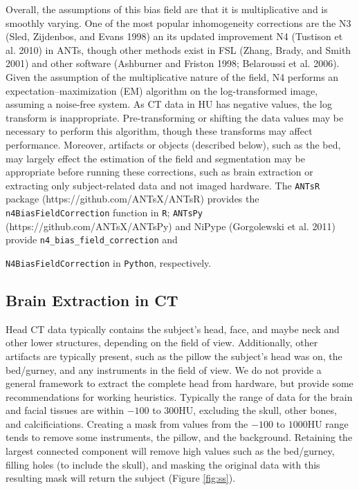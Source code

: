 \documentclass[]{elsarticle} %
\begin{document}
Overall, the assumptions of this bias field are that it is multiplicative and is smoothly varying. One of the most popular inhomogeneity corrections are the N3 (Sled, Zijdenbos, and Evans 1998) an its updated improvement N4 (Tustison et al. 2010) in ANTs, though other methods exist in FSL (Zhang, Brady, and Smith 2001) and other software (Ashburner and Friston 1998; Belaroussi et al. 2006). Given the assumption of the multiplicative nature of the field, N4 performs an expectation--maximization (EM) algorithm on the log-transformed image, assuming a noise-free system. As CT data in HU has negative values, the log transform is inappropriate. Pre-transforming or shifting the data values may be necessary to perform this algorithm, though these transforms may affect performance. Moreover, artifacts or objects (described below), such as the bed, may largely effect the estimation of the field and segmentation may be appropriate before running these corrections, such as brain extraction or extracting only subject-related data and not imaged hardware. The \texttt{ANTsR} package (https://github.com/ANTsX/ANTsR) provides the \texttt{n4BiasFieldCorrection} function in \texttt{R}; \texttt{ANTsPy} (https://github.com/ANTsX/ANTsPy) and NiPype (Gorgolewski et al. 2011) provide \texttt{n4\_bias\_field\_correction} and

\texttt{N4BiasFieldCorrection} in \texttt{Python}, respectively.

\hypertarget{brain-extraction-in-ct}{%
\subsection{Brain Extraction in CT}\label{brain-extraction-in-ct}}

Head CT data typically contains the subject's head, face, and maybe neck and other lower structures, depending on the field of view. Additionally, other artifacts are typically present, such as the pillow the subject's head was on, the bed/gurney, and any instruments in the field of view. We do not provide a general framework to extract the complete head from hardware, but provide some recommendations for working heuristics. Typically the range of data for the brain and facial tissues are within \(-100\) to \(300\)HU, excluding the skull, other bones, and calcificiations. Creating a mask from values from the \(-100\) to \(1000\)HU range tends to remove some instruments, the pillow, and the background. Retaining the largest connected component will remove high values such as the bed/gurney, filling holes (to include the skull), and masking the original data with this resulting mask will return the subject (Figure \ref{fig:ss}).
\end{document}
